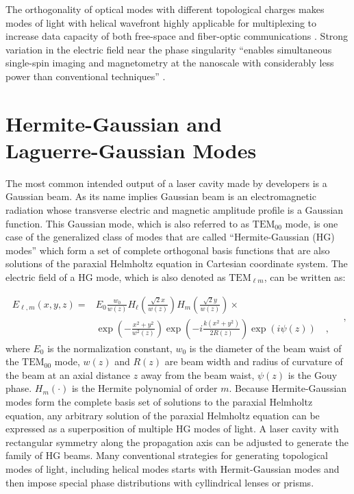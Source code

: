 The orthogonality of optical modes with different topological charges makes modes of light with helical wavefront highly applicable for multiplexing to increase data capacity of both free-space and fiber-optic communications \cite{Gibson:04, Willner_2016, Bozinovic1545, SHAO2018545}. Strong variation in the electric field near the phase singularity ``enables simultaneous single-spin imaging and magnetometry at the nanoscale with considerably less power than conventional techniques'' \cite{maurer2010}.

\section{Hermite-Gaussian and \\ Laguerre-Gaussian Modes}

The most common intended output of a laser cavity made by developers is a Gaussian beam. As its name implies Gaussian beam is an electromagnetic radiation whose transverse electric and magnetic amplitude profile is a Gaussian function. This Gaussian mode, which is also referred to as $\mathrm{TEM}_{00}$ mode, is one case of the generalized class of modes that are called ``Hermite-Gaussian (HG) modes'' which form a set of complete orthogonal basis functions that are also solutions of the paraxial Helmholtz equation in Cartesian coordinate system. The electric field of a HG mode, which is also denoted as $\mathrm{TEM}_{\ell m}$, can be written as:

\begin{equation}
\label{eq:HG beam}
\begin{split}
E_{\ell,m}(x,y,z) = & E_0 \frac{w_0}{w(z)} H_{\ell}\left( \frac{\sqrt{2}x}{w(z)}\right) H_{m}\left(\frac{\sqrt{2}y}{w(z)}\right) \times \\
& \exp \left(-\frac{x^2 + y^2}{w^2 (z)}\right) \exp \left(-i\frac{k(x^2 + y^2)}{2R(z)}\right) \exp (i\psi (z)) \quad ,
\end{split} \quad ,
\end{equation}
where $E_0$ is the normalization constant, $w_0$ is the diameter of the beam waist of the $\mathrm{TEM}_{00}$ mode, $w(z)$ and $R(z)$ are beam width and radius of curvature of the beam at an axial distance $z$ away from the beam waist, $\psi (z)$ is the Gouy phase. $H_{m}(\cdot)$ is the Hermite polynomial \cite{abramowitz+stegun} of order $m$. Because Hermite-Gaussian modes form the complete basis set of solutions to the paraxial Helmholtz equation, any arbitrary solution of the paraxial Helmholtz equation can be expressed as a superposition of multiple HG modes of light. A laser cavity with rectangular symmetry along the propagation axis can be adjusted to generate the family of HG beams. Many conventional strategies for generating topological modes of light, including helical modes starts with Hermit-Gaussian modes and then impose special phase distributions with cyllindrical lenses or prisms.

